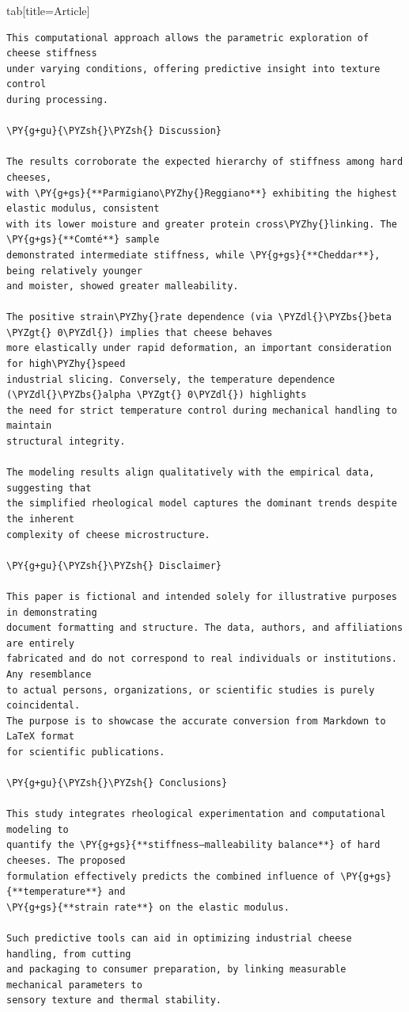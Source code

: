 \documentclass[a4paper,twoside]{article}
\begin{document}
\begin{tsdiv}{tab}[title=Article]
\begin{tscode}[lang=markdown, engine=pygments]
\begin{Verbatim}[commandchars=\\\{\},breaklines, breakanywhere, commandchars=\\\{\}]
This computational approach allows the parametric exploration of cheese stiffness
under varying conditions, offering predictive insight into texture control
during processing.

\PY{g+gu}{\PYZsh{}\PYZsh{} Discussion}

The results corroborate the expected hierarchy of stiffness among hard cheeses,
with \PY{g+gs}{**Parmigiano\PYZhy{}Reggiano**} exhibiting the highest elastic modulus, consistent
with its lower moisture and greater protein cross\PYZhy{}linking. The \PY{g+gs}{**Comté**} sample
demonstrated intermediate stiffness, while \PY{g+gs}{**Cheddar**}, being relatively younger
and moister, showed greater malleability.

The positive strain\PYZhy{}rate dependence (via \PYZdl{}\PYZbs{}beta \PYZgt{} 0\PYZdl{}) implies that cheese behaves
more elastically under rapid deformation, an important consideration for high\PYZhy{}speed
industrial slicing. Conversely, the temperature dependence (\PYZdl{}\PYZbs{}alpha \PYZgt{} 0\PYZdl{}) highlights
the need for strict temperature control during mechanical handling to maintain
structural integrity.

The modeling results align qualitatively with the empirical data, suggesting that
the simplified rheological model captures the dominant trends despite the inherent
complexity of cheese microstructure.

\PY{g+gu}{\PYZsh{}\PYZsh{} Disclaimer}

This paper is fictional and intended solely for illustrative purposes in demonstrating
document formatting and structure. The data, authors, and affiliations are entirely
fabricated and do not correspond to real individuals or institutions. Any resemblance
to actual persons, organizations, or scientific studies is purely coincidental.
The purpose is to showcase the accurate conversion from Markdown to LaTeX format
for scientific publications.

\PY{g+gu}{\PYZsh{}\PYZsh{} Conclusions}

This study integrates rheological experimentation and computational modeling to
quantify the \PY{g+gs}{**stiffness–malleability balance**} of hard cheeses. The proposed
formulation effectively predicts the combined influence of \PY{g+gs}{**temperature**} and
\PY{g+gs}{**strain rate**} on the elastic modulus.

Such predictive tools can aid in optimizing industrial cheese handling, from cutting
and packaging to consumer preparation, by linking measurable mechanical parameters to
sensory texture and thermal stability.


\end{Verbatim}
\end{tscode}
\end{tsdiv}
\end{document}
